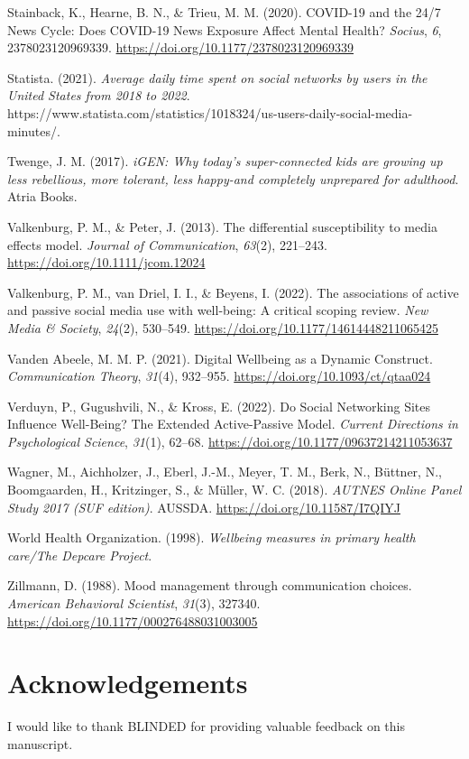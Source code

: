 \documentclass[
  man,mask,floatsintext]{apa7}
\newlength{\cslhangindent}
\newenvironment{CSLReferences}[2] %
 {\begin{list}{}{%
  \setlength{\itemindent}{0pt}
  \setlength{\leftmargin}{0pt}
  \setlength{\parsep}{0pt}
  \ifodd #1
   \setlength{\leftmargin}{\cslhangindent}
   \setlength{\itemindent}{-1\cslhangindent}
  \fi
  \setlength{\itemsep}{#2\baselineskip}}}
 {\end{list}}
\begin{document}
\begin{CSLReferences}{1}{0}
Stainback, K., Hearne, B. N., \& Trieu, M. M. (2020). {COVID-19} and the 24/7 {News Cycle}: {Does COVID-19 News Exposure Affect Mental Health}? \emph{Socius}, \emph{6}, 2378023120969339. \url{https://doi.org/10.1177/2378023120969339}

Statista. (2021). \emph{Average daily time spent on social networks by users in the {United States} from 2018 to 2022}. https://www.statista.com/statistics/1018324/us-users-daily-social-media-minutes/.

Twenge, J. M. (2017). \emph{{iGEN}: {Why} today's super-connected kids are growing up less rebellious, more tolerant, less happy-and completely unprepared for adulthood}. Atria Books.

Valkenburg, P. M., \& Peter, J. (2013). The differential susceptibility to media effects model. \emph{Journal of Communication}, \emph{63}(2), 221--243. \url{https://doi.org/10.1111/jcom.12024}

Valkenburg, P. M., van Driel, I. I., \& Beyens, I. (2022). The associations of active and passive social media use with well-being: {A} critical scoping review. \emph{New Media \& Society}, \emph{24}(2), 530--549. \url{https://doi.org/10.1177/14614448211065425}

Vanden Abeele, M. M. P. (2021). Digital {Wellbeing} as a {Dynamic Construct}. \emph{Communication Theory}, \emph{31}(4), 932--955. \url{https://doi.org/10.1093/ct/qtaa024}

Verduyn, P., Gugushvili, N., \& Kross, E. (2022). Do {Social Networking Sites Influence Well-Being}? {The Extended Active-Passive Model}. \emph{Current Directions in Psychological Science}, \emph{31}(1), 62--68. \url{https://doi.org/10.1177/09637214211053637}

Wagner, M., Aichholzer, J., Eberl, J.-M., Meyer, T. M., Berk, N., Büttner, N., Boomgaarden, H., Kritzinger, S., \& Müller, W. C. (2018). \emph{{AUTNES Online Panel Study} 2017 ({SUF} edition)}. AUSSDA. \url{https://doi.org/10.11587/I7QIYJ}

World Health Organization. (1998). \emph{Wellbeing measures in primary health care/{The Depcare Project}}.

Zillmann, D. (1988). Mood management through communication choices. \emph{American Behavioral Scientist}, \emph{31}(3), 327340. \url{https://doi.org/10.1177/000276488031003005}

\end{CSLReferences}

\section{Acknowledgements}\label{acknowledgements}

I would like to thank BLINDED for providing valuable feedback on this manuscript.
\end{document}
